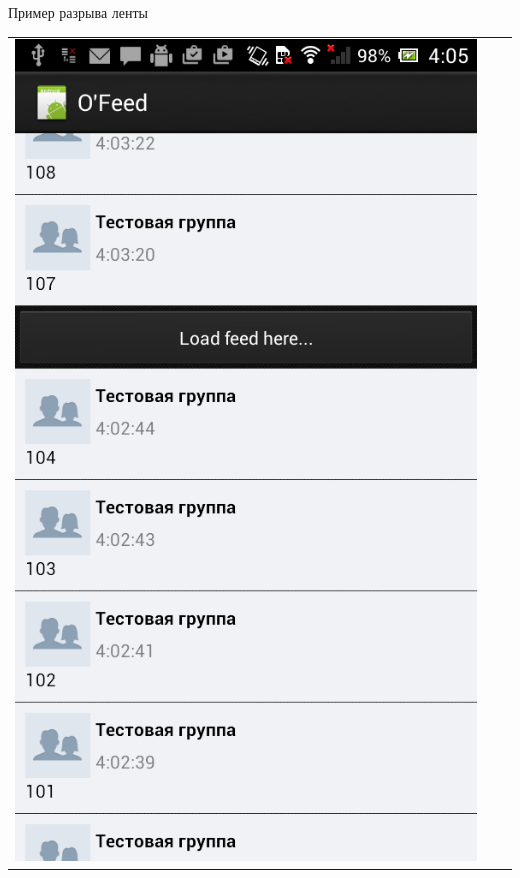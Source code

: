 \documentclass[utf8,xcolor=table]{beamer}
\begin{document}
\begin{frame}[t]{Пример разрыва ленты}
	\begin{center}
		\begin{tabular}{ccc}
			\includegraphics[scale=0.18]{a.png}
			&

\end{tabular}
\end{center}
\end{frame}
\end{document}
